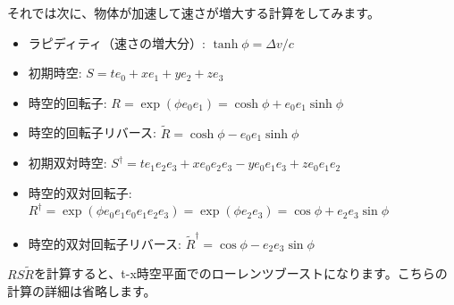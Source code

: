 \documentclass[a4paper,12pt,notitlepage]{jsreport}
\begin{document}
それでは次に、物体が加速して速さが増大する計算をしてみます。
\begin{itemize}
  \item ラピディティ（速さの増大分）: $\tanh\phi=\Delta v/c$
  \item 初期時空: $S=te_0+xe_1+ye_2+ze_3$
  \item 時空的回転子: $R=\exp(\phi e_0e_1)=\cosh\phi+e_0e_1\sinh\phi$
  \item 時空的回転子リバース: $\widetilde{R}=\cosh\phi-e_0e_1\sinh\phi$
  \item 初期双対時空: $S^\dag=te_1e_2e_3+xe_0e_2e_3-ye_0e_1e_3+ze_0e_1e_2$
  \item 時空的双対回転子: $R^\dag=\exp(\phi e_0e_1e_0e_1e_2e_3)=\exp(\phi e_2e_3)=\cos\phi+e_2e_3\sin\phi$
  \item 時空的双対回転子リバース: $\widetilde{R}^\dag=\cos\phi-e_2e_3\sin\phi$
\end{itemize}

$RS\widetilde{R}$を計算すると、t-x時空平面でのローレンツブーストになります。こちらの計算の詳細は省略します。
\end{document}
